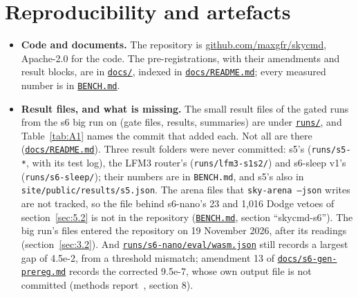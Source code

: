 \documentclass[10pt]{article}
\begin{document}
\section{Reproducibility and artefacts}\label{sec:8}

\begin{itemize}
\item \textbf{Code and documents.} The repository is \href{https://github.com/maxgfr/skycmd}{github.com/maxgfr/skycmd}, Apache-2.0 for the code. The pre-registrations, with their amendments and result blocks, are in \href{https://github.com/maxgfr/skycmd/tree/main/docs}{\texttt{docs/\allowbreak{}}}, indexed in \href{https://github.com/maxgfr/skycmd/blob/main/docs/README.md}{\texttt{docs/\allowbreak{}README.md}}; every measured number is in \href{https://github.com/maxgfr/skycmd/blob/main/BENCH.md}{\texttt{BENCH.md}}.
\item \textbf{Result files, and what is missing.} The small result files of the gated runs from the s6 big run on (gate files, results, summaries) are under \href{https://github.com/maxgfr/skycmd/tree/main/runs}{\texttt{runs/\allowbreak{}}}, and Table~\ref{tab:A1} names the commit that added each. Not all are there (\href{https://github.com/maxgfr/skycmd/blob/main/docs/README.md}{\texttt{docs/\allowbreak{}README.md}}). Three result folders were never committed: s5's (\texttt{runs/\allowbreak{}s5-*}, with its test log), the LFM3 router's (\texttt{runs/\allowbreak{}lfm3-s1s2/\allowbreak{}}) and s6-sleep v1's (\texttt{runs/\allowbreak{}s6-sleep/\allowbreak{}}); their numbers are in \texttt{BENCH.md}, and s5's also in \texttt{site/\allowbreak{}public/\allowbreak{}results/\allowbreak{}s5.json}. The arena files that \texttt{sky-arena --json} writes are not tracked, so the file behind s6-nano's 23 and 1,016 Dodge vetoes of section~\ref{sec:5.2} is not in the repository (\href{https://github.com/maxgfr/skycmd/blob/main/BENCH.md}{\texttt{BENCH.md}}, section ``skycmd-s6''). The big run's files entered the repository on 19 November 2026, after its readings (section~\ref{sec:3.2}). And \href{https://github.com/maxgfr/skycmd/blob/main/runs/s6-nano/eval/wasm.json}{\texttt{runs/\allowbreak{}s6-nano/\allowbreak{}eval/\allowbreak{}wasm.json}} still records a largest gap of 4.5e-2, from a threshold mismatch; amendment 13 of \href{https://github.com/maxgfr/skycmd/blob/main/docs/s6-gen-prereg.md}{\texttt{docs/\allowbreak{}s6-gen-prereg.md}} records the corrected 9.5e-7, whose own output file is not committed (methods report~\cite{golfier2026methods}, section 8).

\end{itemize}
\end{document}
